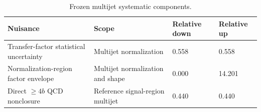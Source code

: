\begin{table}[tb]
  \centering
  \footnotesize
  \caption{Frozen multijet systematic components.}
  \label{tab:multijet-nuisances}
  \begin{tabular}{llll}
    \toprule
    Nuisance & Scope & Relative down & Relative up \\
    \midrule
    Transfer-factor statistical uncertainty & Multijet normalization & 0.558 & 0.558 \\
    Normalization-region factor envelope & Multijet normalization and shape & 0.000 & 14.201 \\
    Direct $\geq4b$ QCD nonclosure & Reference signal-region multijet & 0.440 & 0.440 \\
    \bottomrule
  \end{tabular}
\end{table}
